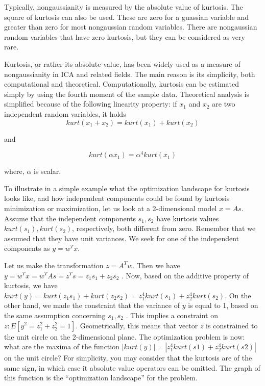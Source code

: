 \documentclass[a4paper]{book}
\begin{document}
    Typically, nongaussianity is measured by the absolute value of
    kurtosis. The square of kurtosis can also be used. These are zero
    for a guassian variable and greater than zero for most nongaussian
    random variables. There are nongaussian random variables that have
    zero kurtosis, but they can be considered as very rare.

    Kurtosis, or rather its absolute value, has been widely used as a
    measure of nongaussianity in ICA and related fields. The main reason
    is its simplicity, both computational and theoretical.
    Computationally, kurtosis can be estimated simply by using the
    fourth moment of the sample data. Theoretical analysis is simplified
    because of the following linearity property: if $x_{1}$ and $x_{2}$
    are two independent random variables, it holds
    \begin{displaymath}
      kurt(x_{1} + x_{2}) = kurt(x_{1}) + kurt(x_{2})
    \end{displaymath}

    and

    \begin{displaymath}
      kurt(\alpha x_{1}) = \alpha^{4}kurt(x_{1})
    \end{displaymath}

    where, $\alpha$ is scalar.

    To illustrate in a simple example what the optimization landscape
    for kurtosis looks like, and how independent components could be
    found by kurtosis minimization or maximization, let us look at a
    2-dimensional model $x = As$. Assume that the independent components
    $s_{1}, s_{2}$ have kurtosis values $kurt(s_{1}), kurt(s_{2})$,
    respectively, both different from zero. Remember that we assumed
    that they have unit variances. We seek for one of the independent
    components as $y = w^{T}x$.

    Let us make the transformation $z = A^{T}w$. Then we have $y =
    w^{T}x = w^{T}As = z^{T}s = z_{1}s_{1} + z_{2}s_{2}$ . Now, based on
    the additive property of kurtosis, we have $kurt(y) =
    kurt(z_{1}s_{1}) + kurt(z_{2}s_{2}) = z_{1}^{4}kurt(s_{1}) +
    z^{4}_{2}kurt(s_{2})$. On the other hand, we made the constraint that
    the variance of $y$ is equal to 1, based on the same assumption
    concerning $s_{1}, s_{2}$ . This implies a constraint on $z: E[y^{2}
    = z^{2}_{1} + z^{2}_{2} = 1]$. Geometrically, this means that vector
    $z$ is constrained to the unit circle on the 2-dimensional plane.
    The optimization problem is now: what are the maxima of the function
    $| kurt(y)| = |z^{4}_{1}kurt(s1) + z_{2}^{4}kurt(s2)|$ on the unit
    circle? For simplicity, you may consider that the kurtosis are of
    the same sign, in which case it absolute value operators can be
    omitted. The graph of this function is the ``optimization
    landscape'' for the problem.
\end{document}
